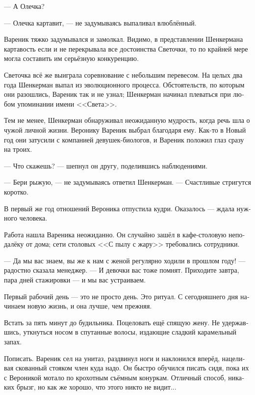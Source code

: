 \documentclass[a5paper,12pt,fleqn]{extbook}\usepackage{cooltooltips}\usepackage{polyglossia}\setdefaultlanguage[babelshorthands=true]{russian}\setotherlanguage{english}\defaultfontfeatures{Ligatures=TeX,Mapping=tex-text} \usepackage{xcolor}\definecolor{lightgray}{HTML}{bbbbbb}\color{lightgray}\newcommand{\ml}[3]{\textenglish{\textcolor{black}{#3}}}
\newcommand{\asterism}{\vspace{1em}{\centering\Large\bfseries$\ast~\ast~\ast$\par}\vspace{1em}}
\begin{document}
--- А Олечка?

--- Олечка картавит, --- не задумываясь выпаливал влюблённый.

Вареник тяжко задумывался и замолкал.
Видимо, в представлении Шенкермана картавость если и не перекрывала все достоинства Светочки, то по крайней мере могла составить им серьёзную конкуренцию.

Светочка всё же выиграла соревнование с небольшим перевесом.
На целых два года Шенкерман выпал из эволюционного процесса.
Обстоятельств, по которым они разошлись, Вареник так и не узнал;
Шенкерман начинал плеваться при любом упоминании имени <<Света>>.

Тем не менее, Шенкерман обнаруживал неожиданную мудрость, когда речь шла о чужой личной жизни.
Веронику Вареник выбрал благодаря ему.
Как-то в Новый год они затусили с компанией девушек-биологов, и Вареник положил глаз сразу на троих.

--- Что скажешь? --- шепнул он другу, поделившись наблюдениями.

--- Бери рыжую, --- не задумываясь ответил Шенкерман.
--- Счастливые стригутся коротко.

В первый же год отношений Вероника отпустила кудри.
Оказалось --- ждала нужного человека.

\asterism

Работа нашла Вареника неожиданно.
Он случайно зашёл в кафе-столовую неподалёку от дома;
сети столовых <<С пылу с жару>> требовались сотрудники.

--- Да мы вас знаем, вы же к нам с женой регулярно ходили в прошлом году! --- радостно сказала менеджер.
--- И девочки вас тоже помнят.
Приходите завтра, пара дней стажировки --- и мы вас устраиваем.

\asterism

Первый рабочий день --- это не просто день.
Это ритуал.
С сегодняшнего дня начинаем новую жизнь, и она лучше, чем прежняя.

Встать за пять минут до будильника.
Поцеловать ещё спящую жену.
Не удержавшись, уткнуться носом в спутанные волосы, издающие сладкий карамельный запах.

Пописать.
Вареник сел на унитаз, раздвинул ноги и наклонился вперёд, нацеливая скованный стояком член куда надо.
Он быстро обучился писать сидя, пока их с Вероникой мотало по крохотным съёмным конуркам.
Отличный способ, никаких брызг, но как же хорошо, что этого никто не видит...
\end{document}
